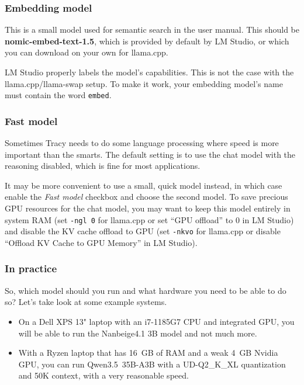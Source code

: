 \documentclass[hidelinks,titlepage,a4paper,twoside]{article}
\begin{document}
\subsubsection{Embedding model}

This is a small model used for semantic search in the user manual. This should be \textbf{nomic-embed-text-1.5}, which is provided by default by LM Studio, or which you can download on your own for llama.cpp.

LM Studio properly labels the model's capabilities. This is not the case with the llama.cpp/llama-swap setup. To make it work, your embedding model's name must contain the word \texttt{embed}.

\subsubsection{Fast model}

Sometimes Tracy needs to do some language processing where speed is more important than the smarts. The default setting is to use the chat model with the reasoning disabled, which is fine for most applications.

It may be more convenient to use a small, quick model instead, in which case enable the \emph{Fast model} checkbox and choose the second model. To save precious GPU resources for the chat model, you may want to keep this model entirely in system RAM (set \texttt{-ngl 0} for llama.cpp or set \enquote{GPU offload} to 0 in LM Studio) and disable the KV cache offload to GPU (set \texttt{-nkvo} for llama.cpp or disable \enquote{Offload KV Cache to GPU Memory} in LM Studio).

\subsubsection{In practice}

So, which model should you run and what hardware you need to be able to do so? Let's take look at some example systems.

\begin{itemize}
\item On a Dell XPS 13" laptop with an i7-1185G7 CPU and integrated GPU, you will be able to run the Nanbeige4.1 3B model and not much more.
\item With a Ryzen laptop that has 16~GB of RAM and a weak 4~GB Nvidia GPU, you can run Qwen3.5~35B-A3B with a UD-Q2\_K\_XL quantization and 50K context, with a very reasonable speed.
\end{itemize}
\end{document}
